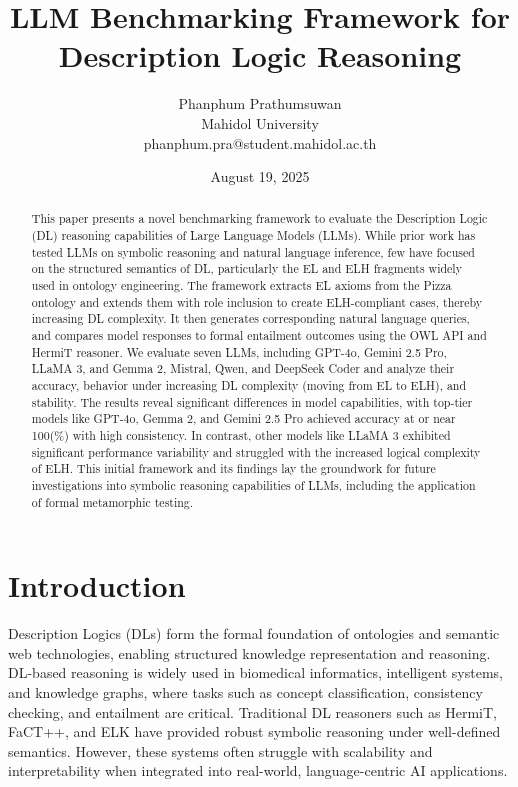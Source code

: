 \documentclass[11pt]{article}
\title{LLM Benchmarking Framework for Description Logic Reasoning}
\author{Phanphum Prathumsuwan\\Mahidol University\\phanphum.pra@student.mahidol.ac.th}
\date{August 19, 2025}
\begin{document}
\maketitle

\begin{abstract}
This paper presents a novel benchmarking framework to evaluate the Description Logic (DL) reasoning capabilities of Large Language Models (LLMs). 
While prior work has tested LLMs on symbolic reasoning and natural language inference\cite{leapofthought2020,han2022folio}, few have focused on the structured semantics of DL, particularly the EL and ELH fragments widely used in ontology engineering\cite{baader2005el}. 
The framework extracts EL axioms from the Pizza ontology\cite{stanford2025pizza, horridge2004pizza} and extends them with role inclusion to create ELH-compliant cases, thereby increasing DL complexity. It then generates corresponding natural language queries, and compares model responses to formal entailment outcomes using the OWL API\cite{owlapi} and HermiT reasoner\cite{hermit2007, glimm2014hermit}. 
We evaluate seven LLMs, including GPT-4o\cite{gpt4o}, Gemini 2.5 Pro\cite{gemini}, LLaMA 3\cite{llama3}, and Gemma 2\cite{gemma3}, Mistral\cite{mistral}, Qwen\cite{qwen7b}, and DeepSeek Coder\cite{deepseekcoder} and analyze their accuracy, behavior under increasing DL complexity (moving from EL to ELH), and stability. 
The results reveal significant differences in model capabilities, with top-tier models like GPT-4o, Gemma 2, and Gemini 2.5 Pro achieved accuracy at or near 100(\%) with high consistency. In contrast, other models like LLaMA 3 exhibited significant performance variability and struggled with the increased logical complexity of ELH.
This initial framework and its findings lay the groundwork for future investigations into symbolic reasoning capabilities of LLMs, including the application of formal metamorphic testing\cite{racharak2025test,chen2018metamorphic}.
\end{abstract}

\section{Introduction}
Description Logics (DLs) form the formal foundation of ontologies and semantic web technologies, enabling structured knowledge representation and reasoning\cite{baader2007description}. 
DL-based reasoning is widely used in biomedical informatics\cite{bodenreider2004biomedical}, intelligent systems, and knowledge graphs\cite{ji2022knowledge}, where tasks such as concept classification, consistency checking, and entailment are critical. 
Traditional DL reasoners such as HermiT\cite{glimm2014hermit}, FaCT++\cite{tsarkov2006fact}, and ELK\cite{kazakov2014elk} have provided robust symbolic reasoning under well-defined semantics. 
However, these systems often struggle with scalability and interpretability when integrated into real-world, language-centric AI applications.
\end{document}
